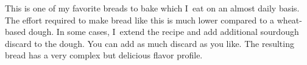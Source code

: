 This is one of my favorite breads to bake which I~eat on an
almost daily basis. The effort required to make bread like
this is much lower compared to a wheat-based dough. In some
cases, I~extend the recipe and add additional sourdough discard
to the dough. You can add as much discard as you like. The resulting
bread has a very complex but delicious flavor profile.
